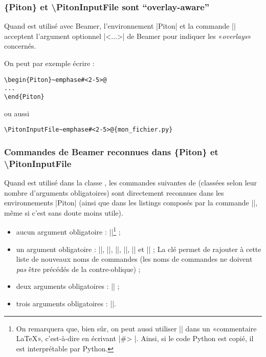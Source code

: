 \documentclass[dvipsnames,svgnames]{article}
\begin{document}
\subsubsection{\{Piton\} et \textbackslash PitonInputFile sont ``overlay-aware''}

Quand  est utilisé avec Beamer, l'environnement |{Piton}| et la commande
|\PitonInputFile| acceptent l'argument optionnel |<...>| de Beamer pour indiquer les
«\emph{overlays}» concernés.

On peut par exemple écrire :

\begin{Verbatim}
\begin{Piton}~emphase#<2-5>@
...
\end{Piton}
\end{Verbatim}

ou aussi 

\begin{Verbatim}
\PitonInputFile~emphase#<2-5>@{mon_fichier.py}
\end{Verbatim}


\subsubsection{Commandes de Beamer reconnues dans \{Piton\} et \textbackslash PitonInputFile}


Quand  est utilisé dans la classe , les commandes suivantes de
 (classées selon leur nombre d'arguments obligatoires) sont directement
reconnues dans les environnements |{Piton}| (ainsi que dans les listings composés par la
commande |\PitonInputFile|, même si c'est sans doute moins utile).
%
\begin{itemize}
\item aucun argument obligatoire : |\pause|\footnote{On remarquera que, bien sûr, on peut
aussi utiliser |\pause| dans un «commentaire LaTeX», c'est-à-dire en écrivant 
|#> \pause|. Ainsi, si le code Python est copié, il est   interprétable par Python.} ;  
\item un argument obligatoire : |\action|, |\alert|, |\invisible|, |\only|, |\uncover| et
|\visible| ; \newline 
La clé  permet de rajouter à cette liste de nouveaux
noms de commandes (les noms de commandes ne doivent \emph{pas} être précédés de la
contre-oblique) ;  
\item deux arguments obligatoires : |\alt| ;
\item trois arguments obligatoires : |\temporal|.
\end{itemize}
\end{document}
